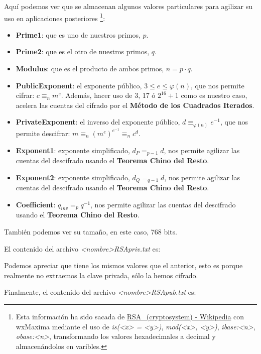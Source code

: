 \documentclass[a4paper, 11pt]{article}
\begin{document}
		Aquí podemos ver que se almacenan algunos valores particulares para agilizar su uso en aplicaciones posteriores
		\footnote{Esta información ha sido sacada de \href{https://en.wikipedia.org/wiki/RSA\_(cryptosystem)\#Using\_the\_Chinese\_remainder\_algorithm}
		{RSA\_(cryptosystem) - Wikipedia}  con wxMaxima mediante el uso de \textit{is(<x> = <y>)}, \textit{mod(<x>, <y>)},
		\textit{ibase:<n>}, \textit{obase:<n>}, transformando los valores hexadecimales a decimal y almacenándolos en varibles.}:
		\begin{itemize}
			\item \textbf{Prime1}: que es uno de nuestros primos, $p$.
			\item \textbf{Prime2}: que es el otro de nuestros primos, $q$.
			\item \textbf{Modulus}: que es el producto de ambos primos, $n = p \cdot q$.
			\item \textbf{PublicExponent}: el exponente público, $3 \le e \le \varphi(n)$, que nos permite cifrar: $c \equiv_n m^e$.
			Además, hacer uso de 3, 17 ó $2^{16}+1$ como es nuestro caso, acelera las cuentas del cifrado por el \textbf{Método
			de los Cuadrados Iterados}.
			\item \textbf{PrivateExponent}: el inverso del exponente público, $d \equiv_{\varphi(n)} e^{-1}$, que nos
			permite descifrar: $m \equiv_n (m^e)^{e^{-1}}\equiv_n c^d$.
			\item \textbf{Exponent1}: exponente simplificado, $d_P =_{p-1} d$, nos permite agilizar las cuentas del descifrado
			usando el \textbf{Teorema Chino del Resto}.
			\item \textbf{Exponent2}: exponente simplificado, $d_Q =_{q-1} d$, nos permite agilizar las cuentas del descifrado
			usando el \textbf{Teorema Chino del Resto}.
			\item \textbf{Coefficient}: $q_{inv} =_{p} q^{-1}$, nos permite agilizar las cuentas del descifrado usando el
			\textbf{Teorema Chino del Resto}.
		\end{itemize}
		
		También podemos ver su tamaño, en este caso, 768 bits.
		
		El contenido del archivo \textit{<nombre>RSApriv.txt} es:
		
		
		Podemos apreciar que tiene los mismos valores que el anterior, esto es porque realmente no extraemos la clave privada,
		sólo la hemos cifrado.
		
		Finalmente, el contenido del archivo \textit{<nombre>RSApub.txt} es:
		
		
\end{document}
